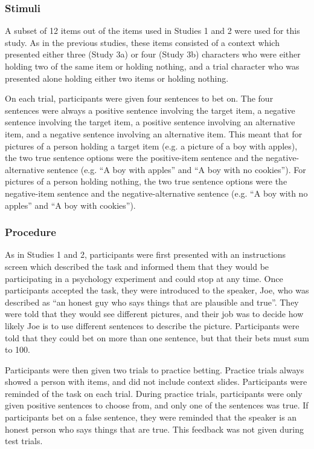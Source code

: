 \documentclass[10pt,letterpaper]{article}
\begin{document}
\subsubsection{Stimuli}
A subset of 12 items out of the items used in Studies 1 and 2 were used for this study.  As in the previous studies, these items consisted of a context which presented either three (Study 3a) or four (Study 3b) characters who were either holding two of the same item or holding nothing, and a trial character who was presented alone holding either two items or holding nothing.  

On each trial, participants were given four sentences to bet on.  The four sentences were always a positive sentence involving the target item, a negative sentence involving the target item, a positive sentence involving an alternative item, and a negative sentence involving an alternative item.  This meant that for pictures of a person holding a target item (e.g. a picture of a boy with apples), the two true sentence options were the positive-item sentence and the negative-alternative sentence (e.g. ``A boy with apples'' and ``A boy with no cookies'').  For pictures of a person holding nothing, the two true sentence options were the negative-item sentence and the negative-alternative sentence (e.g. ``A boy with no apples'' and ``A boy with cookies'').   

\subsubsection{Procedure}
As in Studies 1 and 2, participants were first presented with an instructions screen which described the task and informed them that they would be participating in a psychology experiment and could stop at any time.  Once participants accepted the task, they were introduced to the speaker, Joe, who was described as ``an honest guy who says things that are plausible and true''.  They were told that they would see different pictures, and their job was to decide how likely Joe is to use different sentences to describe the picture.  Participants were told that they could bet on more than one sentence, but that their bets must sum to 100.  

Participants were then given two trials to practice betting.  Practice trials always showed a person with items, and did not include context slides.  Participants were reminded of the task on each trial.  During practice trials, participants were only given positive sentences to choose from, and only one of the sentences was true.  If participants bet on a false sentence, they were reminded that the speaker is an honest person who says things that are true.  This feedback was not given during test trials.
\end{document}
